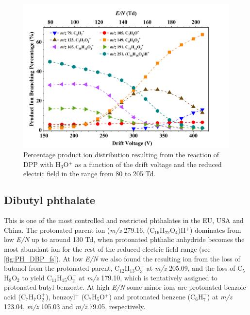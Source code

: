 \begin{figure}[htbp]
\centering
\includegraphics[height=0.4\textheight]{pics/DPP-BR.png}
\caption{Percentage product ion distribution resulting from the reaction of DPP with H$_3$O$^+$ as a function of the drift voltage and the reduced electric field in the range from 80 to 205 Td.}
\label{fig:PH_DPP_fs}
\end{figure}



\subsection{Dibutyl phthalate}


This is one of the most controlled and restricted phthalates in the EU, USA and  China.
The protonated parent ion (\textit{m/z} 279.16, (C$_{16}$H$_{22}$O$_4$)H$^+$) dominates from low \textit{E/N} up to around 130 Td, when protonated phthalic anhydride becomes the most abundant ion for the rest of the reduced electric field range (see \autoref{fig:PH_DBP_fs}).
At low \textit{E/N} we also found the resulting ion from the loss of butanol from the protonated parent, C$_{12}$H$_{13}$O$_3^+$ at \textit{m/z} 205.09,  and the loss of C$_{5}$H$_{8}$O$_2$ to yield C$_{11}$H$_{15}$O$_2^+$ at \textit{m/z} 179.10, which is tentatively assigned to protonated butyl benzoate.
At high \textit{E/N} some minor ions are protonated benzoic acid (C$_{7}$H$_{7}$O$_2^+$), benzoyl$^+$ (C$_7$H$_{5}$O$^+$) and protonated benzene (C$_6$H$_{7}^+$) at \textit{m/z} 123.04, \textit{m/z} 105.03 and \textit{m/z} 79.05, respectively.




